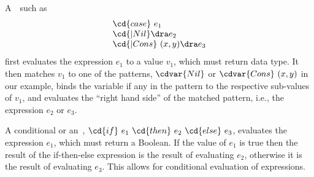 \begin{cluster}
\label{grp:grm:sparc::case-expressions}

\begin{gram}
\label{grm:sparc::case-expressions}
A~~such as 
\[
\begin{array}{l}
\cd{case}~e_1 \\
\cd{| Nil}\dra e_2 \\ 
\cd{| Cons}~(x,y)\dra e_3 \\
\end{array}
\]
first evaluates the expression $e_1$ to a value $v_1$, which must
return data type.
It then matches $v_1$ to one of the patterns, $\cdvar{Nil}$ or
$\cdvar{Cons}~(x,y)$ in our example, binds the variable if any in the
pattern to the respective sub-values of $v_1$, and evaluates the
``right hand side'' of the matched pattern, i.e., the expression $e_2$
or $e_3$.

\end{gram}
\end{cluster}

\begin{cluster}
\label{grp:grm:sparc::conditionals}

\begin{gram}[Conditionals]
\label{grm:sparc::conditionals}
A conditional or an~,
$\cd{if}~e_1~\cd{then}~e_2~\cd{else}~e_3$, evaluates the expression $e_1$,
which must return a Boolean.
If the value of $e_1$ is true then the result of the if-then-else
expression is the result of evaluating $e_2$, otherwise it is the
result of evaluating $e_3$.  
This allows for conditional evaluation of expressions.

\end{gram}
\end{cluster}

